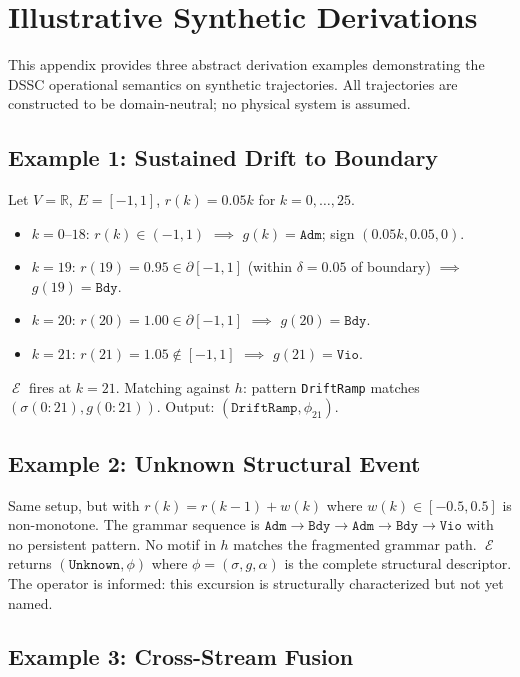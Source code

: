 \documentclass[11pt,a4paper]{article}
\theoremstyle{plain}
\theoremstyle{definition}
\theoremstyle{remark}
\DeclareMathOperator{\Endo}{\mathcal{E}}
\newcommand{\R}{\mathbb{R}}
\begin{document}
\section{Illustrative Synthetic Derivations}
\label{app:derivations}

This appendix provides three abstract derivation examples demonstrating the DSSC operational
semantics on synthetic trajectories. All trajectories are constructed to be domain-neutral; no
physical system is assumed.

\subsection*{Example 1: Sustained Drift to Boundary}

Let $V = \R$, $E = [-1, 1]$, $r(k) = 0.05k$ for $k = 0, \ldots, 25$.
\begin{itemize}[nosep]
  \item $k = 0$--$18$: $r(k) \in (-1, 1)$ $\implies$ $g(k) = \mathtt{Adm}$; sign $(0.05k, 0.05, 0)$.
  \item $k = 19$: $r(19) = 0.95 \in \partial[-1,1]$ (within $\delta = 0.05$ of boundary)
    $\implies$ $g(19) = \mathtt{Bdy}$.
  \item $k = 20$: $r(20) = 1.00 \in \partial[-1,1]$ $\implies$ $g(20) = \mathtt{Bdy}$.
  \item $k = 21$: $r(21) = 1.05 \notin [-1,1]$ $\implies$ $g(21) = \mathtt{Vio}$.
\end{itemize}
$\Endo$ fires at $k = 21$. Matching against $h$: pattern \texttt{DriftRamp} matches
$(\sigma(0{:}21), g(0{:}21))$. Output: $(\texttt{DriftRamp}, \phi_{21})$.

\subsection*{Example 2: Unknown Structural Event}

Same setup, but with $r(k) = r(k-1) + w(k)$ where $w(k) \in [-0.5, 0.5]$ is non-monotone.
The grammar sequence is $\mathtt{Adm} \to \mathtt{Bdy} \to \mathtt{Adm} \to \mathtt{Bdy} \to
\mathtt{Vio}$ with no persistent pattern. No motif in $h$ matches the fragmented grammar path.
$\Endo$ returns $(\mathtt{Unknown}, \phi)$ where $\phi = (\sigma, g, \alpha)$ is the complete
structural descriptor. The operator is informed: this excursion is structurally characterized
but not yet named.

\subsection*{Example 3: Cross-Stream Fusion}
\end{document}
